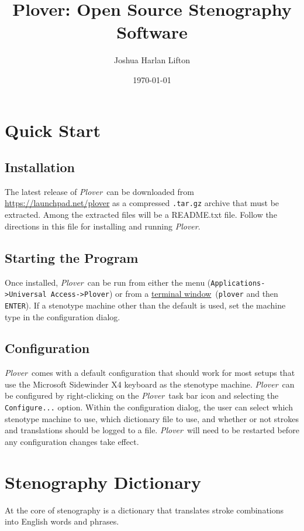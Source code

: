 \documentclass[11pt]{article}
\newcommand{\plover}{\emph{Plover}}
\newcommand{\code}[1]{\texttt{#1}}
\newcommand{\terminal}{\href{https://help.ubuntu.com/community/UsingTheTerminal}{terminal window}}
\begin{document}
\setlength{\parindent}{0pt} %

\title{Plover: Open Source Stenography Software}
\author{Joshua Harlan Lifton}
\date{\today}

\maketitle

\section{Quick Start}

\subsection{Installation}
The latest release of \plover~can be downloaded from
\url{https://launchpad.net/plover} as a compressed \code{.tar.gz}
archive that must be extracted. Among the extracted files will be a
README.txt file. Follow the directions in this file for installing and
running \plover.

\subsection{Starting the Program}
Once installed, \plover~can be run from either the menu
(\code{Applications->Universal Access->Plover}) or from a
\terminal~(\code{plover} and then \code{ENTER}). If a stenotype
machine other than the default is used, set the machine type in the
configuration dialog.

\subsection{Configuration}
\label{config}

\plover~comes with a default configuration that should work for most
setups that use the Microsoft Sidewinder X4 keyboard as the stenotype
machine. \plover~can be configured by right-clicking on the
\plover~task bar icon and selecting the \code{Configure...}
option. Within the configuration dialog, the user can select which
stenotype machine to use, which dictionary file to use, and whether or
not strokes and translations should be logged to a file. \plover~will
need to be restarted before any configuration changes take effect.

\section{Stenography Dictionary}
At the core of stenography is a dictionary that translates stroke
combinations into English words and phrases.
\end{document}
